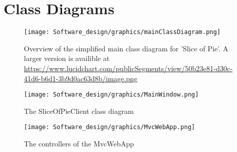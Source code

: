 \section{Class Diagrams}
\label{sec:class-diagrams-appendix}

\begin{figure}[H]
    \begin{center}
        \texttt{[image: Software\_design/graphics/mainClassDiagram.png]}
        \caption{Overview of the simplified main class diagram for 'Slice of Pie'. A larger version is availible at \url{https://www.lucidchart.com/publicSegments/view/50b23e81-d30c-41d6-b6d1-3b9d0ac63d8b/image.png}}
        \label{fig:design-class_diagram} 
    \end{center}
\end{figure}

\begin{figure}[htb]
    \centering
    \texttt{[image: Software\_design/graphics/MainWindow.png]}
    \caption{The SliceOfPieClient class diagram}
    \label{fig:mainwindow-diagram}
\end{figure}

\begin{figure}[hbt]
    \centering
    \texttt{[image: Software\_design/graphics/MvcWebApp.png]}
    \caption{The controllers of the MvcWebApp}
    \label{fig:mvcwebapp-diagram}
\end{figure}
